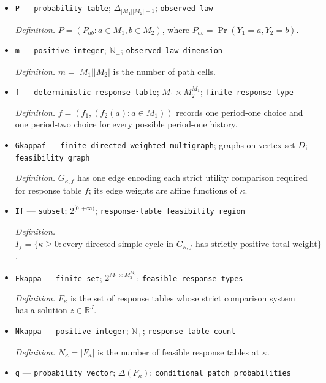 \documentclass{article}
\begin{document}
\begin{itemize}
  \par\smallskip\noindent\emph{Definition.} \(V_{td}=-p_{td}+\kappa\mathbf 1\{d=Y_{t-1}\}+\lambda_d+\epsilon_{td}\).
  \item \texttt{P} --- \texttt{probability table}; \(\Delta_{|M_1||M_2|-1}\); \texttt{observed law}
  \par\smallskip\noindent\emph{Definition.} \(P=(P_{ab}:a\in M_1,b\in M_2)\), where \(P_{ab}=\Pr(Y_1=a,Y_2=b)\).
  \item \texttt{m} --- \texttt{positive integer}; \(\mathbb N_+\); \texttt{observed-\allowbreak{}law dimension}
  \par\smallskip\noindent\emph{Definition.} \(m=|M_1||M_2|\) is the number of path cells.
  \item \texttt{f} --- \texttt{deterministic response table}; \(M_1\times M_2^{M_1}\); \texttt{finite response type}
  \par\smallskip\noindent\emph{Definition.} \(f=(f_1,(f_2(a):a\in M_1))\) records one period-one choice and one period-two choice for every possible period-one history.
  \item \texttt{Gkappaf} --- \texttt{finite directed weighted multigraph}; graphs on vertex set \(D\); \texttt{feasibility graph}
  \par\smallskip\noindent\emph{Definition.} \(G_{\kappa,f}\) has one edge encoding each strict utility comparison required for response table \(f\); its edge weights are affine functions of \(\kappa\).
  \item \texttt{If} --- \texttt{subset}; \(2^{[0,+\infty)}\); \texttt{response-\allowbreak{}table feasibility region}
  \par\smallskip\noindent\emph{Definition.} \(I_f=\{\kappa\ge0:\text{every directed simple cycle in }G_{\kappa,f}\text{ has strictly positive total weight}\}\).
  \item \texttt{Fkappa} --- \texttt{finite set}; \(2^{M_1\times M_2^{M_1}}\); \texttt{feasible response types}
  \par\smallskip\noindent\emph{Definition.} \(F_\kappa\) is the set of response tables whose strict comparison system has a solution \(z\in\mathbb R^J\).
  \item \texttt{Nkappa} --- \texttt{positive integer}; \(\mathbb N_+\); \texttt{response-\allowbreak{}table count}
  \par\smallskip\noindent\emph{Definition.} \(N_\kappa=|F_\kappa|\) is the number of feasible response tables at \(\kappa\).
  \item \texttt{q} --- \texttt{probability vector}; \(\Delta(F_\kappa)\); \texttt{conditional patch probabilities}

\end{itemize}
\end{document}
